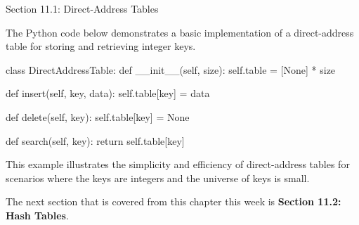 \begin{notes}{Section 11.1: Direct-Address Tables}
    \begin{highlight}
        The Python code below demonstrates a basic implementation of a direct-address table for storing and retrieving integer keys.
    \begin{code}[Python]
    class DirectAddressTable:
        def __init__(self, size):
            self.table = [None] * size
    
        def insert(self, key, data):
            self.table[key] = data
    
        def delete(self, key):
            self.table[key] = None
    
        def search(self, key):
            return self.table[key]
    \end{code}
        This example illustrates the simplicity and efficiency of direct-address tables for scenarios where the keys are integers and the universe of keys is small.
    \end{highlight}      
\end{notes}

The next section that is covered from this chapter this week is \textbf{Section 11.2: Hash Tables}.

